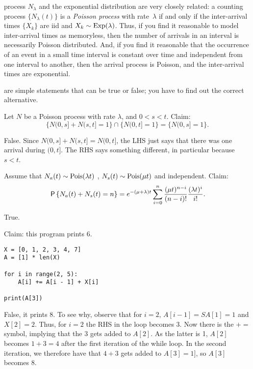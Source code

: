 \documentclass[stochastic-or.tex]{subfiles}
\begin{document}
 process $N_{\lambda}$ and the exponential distribution are very closely related: a counting process $\{N_{\lambda}(t)\}$ is a \emph{Poisson process} with rate~$\lambda$ if and only if the inter-arrival times $\{X_k\}$ are iid and $X_{k} \sim \Exp{\lambda}$.
Thus, if you find it reasonable to model inter-arrival times as memoryless, then the number of arrivals in an interval is necessarily Poisson distributed.
And, if you find it reasonable that the occurrence of an event in a small time interval is constant over time and independent from one interval to another, then the arrival process is Poisson, and the inter-arrival times are exponential.


 are simple statements that can be true or false; you have to find out the correct alternative.



\begin{truefalse}
Let $N$ be a Poisson process with rate $\lambda$, and $0<s<t$. Claim:
 \begin{equation*}
\{N(0,s]+N(s,t]=1\}\cap\{N(0,t]=1\} = \{N(0,s]=1\}.
 \end{equation*}
\begin{solution}
False. Since $N(0,s] + N(s, t] = N(0,t]$, the LHS just says that there was one arrival during $(0,t]$. The RHS says something different, in particular because $s<t$.
\end{solution}
\end{truefalse}

\begin{truefalse}
Assume that
 $N_a(t)\sim \Pois{\lambda t}$ , $N_s(t) \sim \Pois{\mu t}$ and
 independent. Claim:
\begin{equation*}
\P{N_a(t) + N_s(t) = n}
= e^{-(\mu+\lambda)t} \sum_{i=0}^n \frac{(\mu t)^{n-i}}{(n-i)!} \frac{(\lambda t)^i}{i!}. \\
\end{equation*}
\begin{solution}
 True.
\end{solution}
\end{truefalse}

\begin{truefalse}
Claim: this program prints 6.
\begin{verbatim}
X = [0, 1, 2, 3, 4, 7]
A = [1] * len(X)

for i in range(2, 5):
    A[i] += A[i - 1] + X[i]

print(A[3])
\end{verbatim}
\begin{solution}
False, it prints 8. To see why, observe that for $i=2$, $A[i-1] = SA[1] = 1$ and $X[2] = 2$. Thus, for $i=2$ the RHS in the loop becomes $3$. Now there is the $+=$  symbol, implying that the $3$ gets added to $A[2]$. As the latter is 1, $A[2]$ becomes $1+ 3 = 4$ after the first iteration of the while loop. In the second iteration, we therefore have that $4+3$ gets added to $A[3]=1]$, so $A[3]$ becomes 8.
\end{solution}
\end{truefalse}
\end{document}
